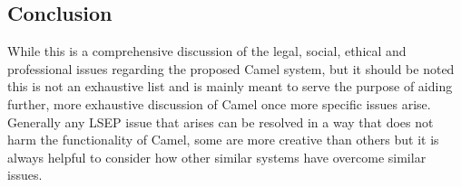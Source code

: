     \subsection*{Conclusion}
    While this is a comprehensive discussion of the legal, social, ethical and professional issues regarding the proposed Camel system, but it should be noted this is not an exhaustive list and is mainly meant to serve the purpose of aiding further, more exhaustive discussion of Camel once more specific issues arise. Generally any LSEP issue that arises can be resolved in a way that does not harm the functionality of Camel, some are more creative than others but it is always helpful to consider how other similar systems have overcome similar issues.
